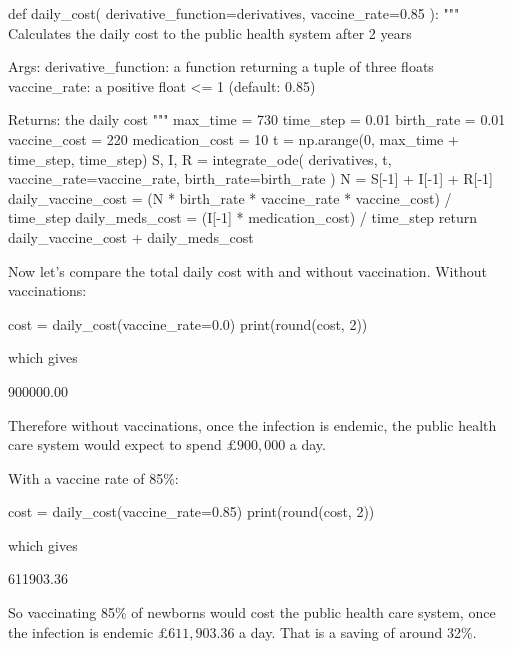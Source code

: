 \begin{pyin}
def daily_cost(
    derivative_function=derivatives, vaccine_rate=0.85
):
    """
    Calculates the daily cost to the public health system
    after 2 years
    
    Args:
        derivative_function: a function returning a tuple
                             of three floats
        vaccine_rate: a positive float <= 1 (default: 0.85)
    
    Returns:
        the daily cost
    """
    max_time = 730
    time_step = 0.01
    birth_rate = 0.01
    vaccine_cost = 220
    medication_cost = 10
    t = np.arange(0, max_time + time_step, time_step)
    S, I, R = integrate_ode(
        derivatives, t,
        vaccine_rate=vaccine_rate,
        birth_rate=birth_rate
    )
    N = S[-1] + I[-1] + R[-1]
    daily_vaccine_cost = (N
                          * birth_rate
                          * vaccine_rate
                          * vaccine_cost) / time_step
    daily_meds_cost = (I[-1] * medication_cost) / time_step
    return daily_vaccine_cost + daily_meds_cost
\end{pyin}

Now let's compare the total daily cost with and without vaccination. Without
vaccinations:

\begin{pyin}
cost = daily_cost(vaccine_rate=0.0)
print(round(cost, 2))
\end{pyin}

which gives

\begin{pyout}
900000.00
\end{pyout}

Therefore without vaccinations, once the infection is endemic, the public health
care system would expect to spend $\pounds 900,000$ a day.

With a vaccine rate of 85\%:

\begin{pyin}
cost = daily_cost(vaccine_rate=0.85)
print(round(cost, 2))
\end{pyin}

which gives

\begin{pyout}
611903.36
\end{pyout}

So vaccinating 85\% of newborns would cost the public health care system, once
the infection is endemic $\pounds 611,903.36$ a day. That is a saving of around
32\%.





